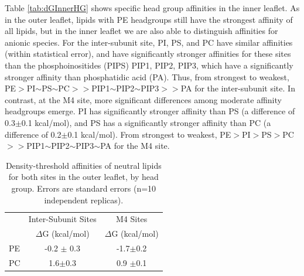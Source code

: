 \documentclass[%
 aip,
 amsmath,amssymb,
 preprint,%
]{revtex4-1}\usepackage{setspace}
\newcommand{\Newaffinities}{Density-threshold affinities}
\newcommand{\liam}[1]{\textcolor{black}{#1}}
\newcommand{\grace}[1]{\textcolor{black}{{#1}}}
\begin{document}
Table \ref{tab:dGInnerHG} shows specific head group affinities in the inner leaflet. %
As in the outer leaflet, lipids with PE headgroups still have the strongest affinity of all lipids, but in the inner leaflet we are also able to distinguish affinities for anionic species. For the inter-subunit site, PI, PS, and PC have similar affinities (within statistical error), and have significantly stronger affinities for these sites than the phosphoinositides (PIPS) PIP1, PIP2, PIP3, which have a significantly stronger affinity than phosphatidic acid  (PA). Thus, from strongest to weakest, PE$>$PI$\sim$PS$\sim$PC$>>$PIP1$\sim$PIP2$\sim$PIP3$>>$PA for the inter-subunit site. In contrast, at the M4 site, more significant differences among moderate affinity headgroups emerge. PI has significantly stronger affinity than PS (a difference of 0.3$\pm$0.1 kcal/mol), and PS has a significantly stronger affinity than PC (a difference of 0.2$\pm$0.1 kcal/mol). %
From strongest to weakest, PE$>$PI$>$PS$>$PC$>>$PIP1$\sim$PIP2$\sim$PIP3$\sim$PA for the M4 site.    %



\begin{table}
	\caption{\Newaffinities{} of neutral lipids for both sites in the outer leaflet, by head group.  Errors are standard errors (n=10 independent replicas). }
    \centering
    \begin{tabular}{|l||c|c|}
    \hline
	{} &   Inter-Subunit Sites&  M4 Sites\\
	{} & $\Delta$G (kcal/mol) & $\Delta$G (kcal/mol)\\
	\hline
	PE	&-0.2 $\pm$ 0.3& -1.7$\pm$0.2\\
	PC & 1.6$\pm$0.3&	0.9 $\pm$0.1\\
	\hline
    \end{tabular}
    \label{tab:dGOuterHG}
\end{table}
\end{document}
